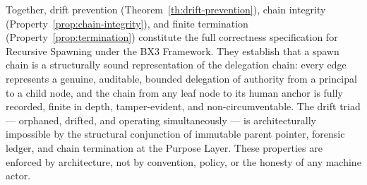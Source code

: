 \medskip
\noindent Together, drift prevention (Theorem~\ref{th:drift-prevention}), chain integrity (Property~\ref{prop:chain-integrity}), and finite termination (Property~\ref{prop:termination}) constitute the full correctness specification for Recursive Spawning under the BX3 Framework. They establish that a spawn chain is a structurally sound representation of the delegation chain: every edge represents a genuine, auditable, bounded delegation of authority from a principal to a child node, and the chain from any leaf node to its human anchor is fully recorded, finite in depth, tamper-evident, and non-circumventable. The drift triad — orphaned, drifted, and operating simultaneously — is architecturally impossible by the structural conjunction of immutable parent pointer, forensic ledger, and chain termination at the Purpose Layer. These properties are enforced by architecture, not by convention, policy, or the honesty of any machine actor.
